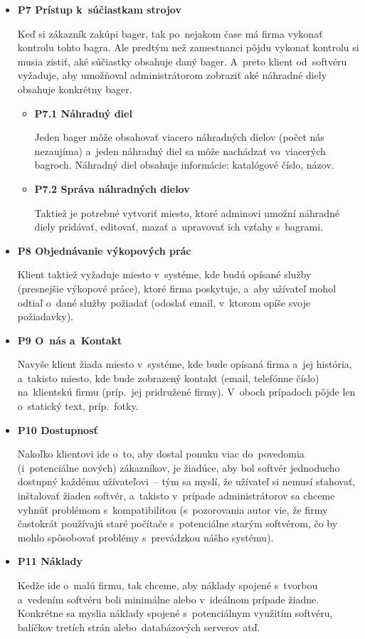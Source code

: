 \begin{itemize}
\item \textbf{P7 Prístup k~súčiastkam strojov}

Keď si zákazník zakúpi bager, tak po~nejakom čase má firma vykonať kontrolu tohto bagra. Ale predtým než zamestnanci pôjdu vykonať kontrolu si musia zistiť, aké súčiastky obsahuje daný bager. A~preto klient od~softvéru vyžaduje, aby umožňoval administrátorom zobraziť aké náhradné diely obsahuje konkrétny bager.

\begin{itemize}
\item \textbf{P7.1 Náhradný diel}

Jeden bager môže obsahovať viacero náhradných dielov (počet nás nezaujíma) a~jeden náhradný diel sa môže nachádzať vo~viacerých bagroch. Náhradný diel obsahuje informácie: katalógové číslo, názov.

\item \textbf{P7.2 Správa náhradných dielov}

Taktiež je potrebné vytvoriť miesto, ktoré adminovi umožní náhradné diely pridávať, editovať, mazať a~upravovať ich vzťahy s~bagrami.
\end{itemize}

\item \textbf{P8 Objednávanie výkopových prác}

Klient taktiež vyžaduje miesto v~systéme, kde budú opísané služby (presnejšie výkopové práce), ktoré firma poskytuje, a~aby užívateľ mohol odtiaľ o~dané služby požiadať (odoslať email, v~ktorom opíše svoje požiadavky).

\item \textbf{P9 O~nás a~Kontakt}

Navyše klient žiada miesto v~systéme, kde bude opísaná firma a~jej história, a~takisto miesto, kde bude zobrazený kontakt (email, telefónne číslo) na~klientskú firmu (príp.~jej pridružené firmy). V~oboch prípadoch pôjde len o~statický text, príp.~fotky.

\item \textbf{P10 Dostupnosť}
\label{dostupnost}

Nakoľko klientovi ide o~to, aby dostal ponuku viac do~povedomia (i~potenciálne nových) zákazníkov, je žiadúce, aby bol softvér jednoducho dostupný každému užívateľovi~-- tým sa myslí, že užívateľ si nemusí sťahovať, inštalovať žiaden softvér, a~takisto v~prípade administrátorov sa chceme vyhnúť problémom s~kompatibilitou (s~pozorovania autor vie, že firmy častokrát používajú staré počítače s~potenciálne starým softvérom, čo by mohlo spôsobovať problémy s~prevádzkou nášho systému).

\item \textbf{P11 Náklady}

Kedže ide o~malú firmu, tak chceme, aby náklady spojené s~tvorbou a~vedením softvéru boli minimálne alebo v~ideálnom prípade žiadne. Konkrétne sa myslia náklady spojené s~potenciálnym využitím softvéru, balíčkov tretích strán alebo~databázových serverov atď.
\end{itemize}

